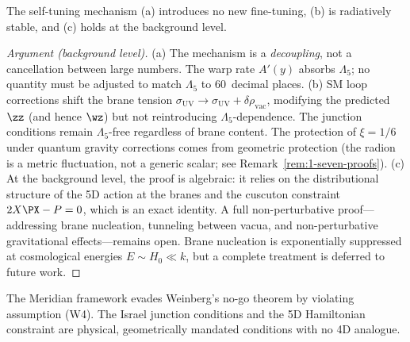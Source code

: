 \begin{claim}
\label{thm:1-rigidity}
The self-tuning mechanism (a) introduces no new fine-tuning, (b) is radiatively stable, and (c) holds at the background level.
\end{claim}

\begin{proof}[Argument (background level)]
(a) The mechanism is a \emph{decoupling}, not a cancellation between large numbers. The warp rate $A'(y)$ absorbs $\Lambda_5$; no quantity must be adjusted to match $\Lambda_5$ to 60~decimal places.
(b) SM loop corrections shift the brane tension $\sigma_\mathrm{UV} \to \sigma_\mathrm{UV} + \delta\rho_\mathrm{vac}$, modifying the predicted $\zz$ (and hence $\wz$) but not reintroducing $\Lambda_5$-dependence. The junction conditions remain $\Lambda_5$-free regardless of brane content. The protection of $\xi = 1/6$ under quantum gravity corrections comes from geometric protection (the radion is a metric fluctuation, not a generic scalar; see Remark~\ref{rem:1-seven-proofs}).
(c) At the background level, the proof is algebraic: it relies on the distributional structure of the 5D action at the branes and the cuscuton constraint $2X\PX - P = 0$, which is an exact identity. A full non-perturbative proof---addressing brane nucleation, tunneling between vacua, and non-perturbative gravitational effects---remains open. Brane nucleation is exponentially suppressed at cosmological energies $E \sim H_0 \ll k$, but a complete treatment is deferred to future work. \qedhere
\end{proof}

\begin{proposition}
\label{thm:1-weinberg-evasion}
The Meridian framework evades Weinberg's no-go theorem by violating assumption (W4). The Israel junction conditions and the 5D Hamiltonian constraint are physical, geometrically mandated conditions with no 4D analogue.
\end{proposition}

